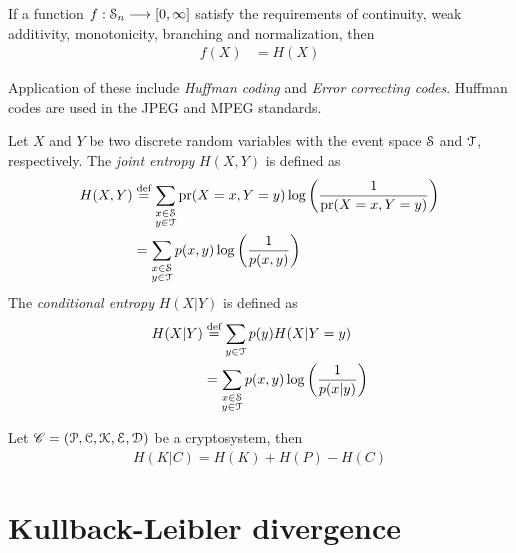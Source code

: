 \documentclass[a4paper, 12pt]{book} %
\begin{document}
\begin{proposition}
If a function $f: \EuScript{S}_n \longrightarrow [0, \infty]$ satisfy the requirements of continuity, weak additivity, monotonicity, branching and normalization, then
\begin{align}
    f(X) &= H(X)
\end{align}
\end{proposition}

Application of these include \emph{Huffman coding} and \emph{Error correcting codes}. Huffman codes are used in the JPEG and MPEG standards.


\begin{definition}
    Let $X$ and $Y$ be two discrete random variables with the event space $\EuScript{S}$ and $\EuScript{T}$, respectively. The \emph{joint entropy} $H(X, Y)$ is defined as
    \begin{align}
        H(X, Y) &\overset{\text{def}}{=} \sum_{ \substack{x \in \EuScript{S} \\ y \in \EuScript{T}}} \operatorname{pr}(X = x, Y = y) \log\bigg( \frac{1}{\operatorname{pr}(X = x, Y = y)}\bigg) \\
        &= \sum_{ \substack{x \in \EuScript{S} \\ y \in \EuScript{T}}} p(x, y) \log \bigg( \frac{1}{p(x, y)}\bigg)
    \end{align}
    The \emph{conditional entropy} $H(X|Y)$ is defined as 
    \begin{align}
        H(X|Y) &\overset{\text{def}}{=} \sum_{y \in \EuScript{T}} p(y)H(X|Y=y) \\
        &= \sum_{\substack{x \in \EuScript{S} \\ y \in \EuScript{T}}} p(x, y) \log \bigg( \frac{1}{p(x|y)}\bigg)
    \end{align}
\end{definition}


\begin{theorem}
    Let $\mathscr{C} = (\EuScript{P}, \EuScript{C}, \EuScript{K}, \EuScript{E}, \EuScript{D})$ be a cryptosystem, then 
    \begin{align}
        H(K|C) = H(K) + H(P) - H(C)
    \end{align}
\end{theorem}

\section{Kullback-Leibler divergence}
\end{document}

